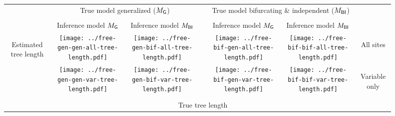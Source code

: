 \documentclass[border=10pt,varwidth=30cm]{standalone}
\newcommand{\genmodel}{\ensuremath{M_{\textrm{\sffamily G}}}\xspace}
\newcommand{\bimodel}{\ensuremath{M_{\textrm{\sffamily BI}}}\xspace}
\begin{document}
\begin{figure}
    \setlength\arrayrulewidth{2pt}
    \centering
    \begin{tabular}{@{}ccccccc@{}}
        & \multicolumn{2}{c}{\LARGE True model generalized (\genmodel)}
        &
        & \multicolumn{2}{c}{\LARGE True model bifurcating \& independent (\bimodel)}
        & \\[1ex]
        \cline{2-3}\cline{5-6}
        & & & & & & \\
        & \multirow{1}{0.19\textwidth}{\centering\Large Inference model \genmodel}
        & \multirow{1}{0.19\textwidth}{\centering\Large Inference model \bimodel}
        &
        & \multirow{1}{0.19\textwidth}{\centering\Large Inference model \genmodel}
        & \multirow{1}{0.19\textwidth}{\centering\Large Inference model \bimodel}
        & \\[4ex]
        \multirow{2}{*}[5em]{\begin{sideways}\Large Estimated tree length\end{sideways}}
        & \texttt{[image: ../free-gen-gen-all-tree-length.pdf]}
        & \texttt{[image: ../free-gen-bif-all-tree-length.pdf]}
        &
        & \texttt{[image: ../free-bif-gen-all-tree-length.pdf]}
        & \texttt{[image: ../free-bif-bif-all-tree-length.pdf]}
        & \multirow{1}{*}[9em]{\begin{sideways}\Large All sites\end{sideways}} \\
        & \texttt{[image: ../free-gen-gen-var-tree-length.pdf]}
        & \texttt{[image: ../free-gen-bif-var-tree-length.pdf]}
        &
        & \texttt{[image: ../free-bif-gen-var-tree-length.pdf]}
        & \texttt{[image: ../free-bif-bif-var-tree-length.pdf]}
        & \multirow{1}{*}[10em]{\begin{sideways}\Large Variable only\end{sideways}} \\
        & \multicolumn{5}{c}{\Large True tree length} & \\
    \end{tabular}
\end{figure}
\end{document}
